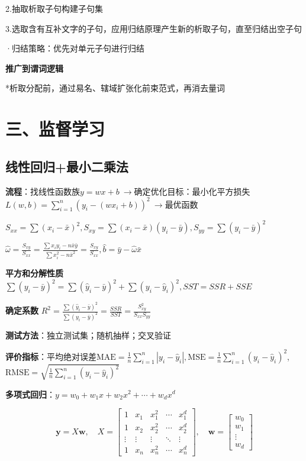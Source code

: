 	2.抽取析取子句构建子句集
	
	3.选取含有互补文字的子句，应用归结原理产生新的析取子句，直至归结出空子句
	
	·归结策略：优先对单元子句进行归结
	
	\textbf{推广到谓词逻辑}
	
	*析取分配前，通过易名、辖域扩张化前束范式，再消去量词
	
	\section*{三、监督学习}
	
	\subsection*{线性回归+最小二乘法}
	
	\textbf{流程}：找线性函数族$y=wx+b~\rightarrow$确定优化目标：最小化平方损失$L(w,b)=\sum_{i=1}^{n}\left(y_{i}-\left(wx_{i}+b\right)\right)^{2}~\rightarrow$最优函数
	
	$\textstyle S_{xx} = \sum\left(x_{i} - \bar{x}\right)^{2}, 
	S_{xy} = \sum\left(x_{i} - \bar{x}\right)\left(y_{i} - \bar{y}\right), 
	S_{yy} = \sum\left(y_{i} - \bar{y}\right)^{2}$
	
	$\hat{\omega} = \frac{S_{xy}}{S_{xx}} 
	= \frac{\sum x_{i}y_{i} - n\bar{x}\bar{y}}{\sum x_{i}^{2} - n\bar{x}^{2}} 
	= \frac{S_{xy}}{S_{xx}}, \hat{b} = \bar{y} - \hat{\omega}\bar{x}$
	
	\textbf{平方和分解性质}$\sum (y_i - \bar{y})^2 = \sum (\hat{y}_i - \bar{y})^2 + \sum (y_i - \hat{y}_i)^2, SST=SSR+SSE$
	
	\textbf{确定系数} $R^2 = \frac{\sum (\hat{y}_i - \bar{y})^2}{\sum (y_i - \bar{y})^2} = \frac{SSR}{SST}=\frac{S_{xy}^2}{S_{xx}S_{yy}}$
	
	\textbf{测试方法}：独立测试集；随机抽样；交叉验证
	
	\textbf{评价指标}：$\text{平均绝对误差MAE} = \frac{1}{n} \sum_{i=1}^{n} |y_i - \hat{y}_i|, \text{MSE} = \frac{1}{n} \sum_{i=1}^{n} (y_i - \hat{y}_i)^2$, $\text{RMSE} = \sqrt{\frac{1}{n} \sum_{i=1}^{n} (y_i - \hat{y}_i)^2}$
	
	\textbf{多项式回归}：$y = w_0 + w_1 x + w_2 x^2 + \cdots + w_d x^d$
	
	$$
	\mathbf{y} = X\mathbf{w}, \quad
	X = \begin{bmatrix}
		1 & x_1 & x_1^2 & \cdots & x_1^d \\
		1 & x_2 & x_2^2 & \cdots & x_2^d \\
		\vdots & \vdots & \vdots & \ddots & \vdots \\
		1 & x_n & x_n^2 & \cdots & x_n^d
	\end{bmatrix}, \quad
	\mathbf{w} = \begin{bmatrix}
		w_0 \\ w_1 \\ \vdots \\ w_d
	\end{bmatrix}
	$$
	
